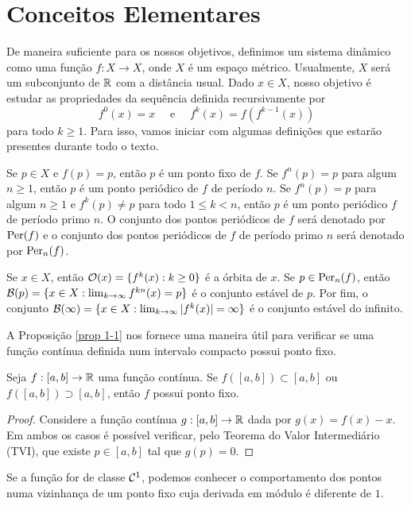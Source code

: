 \section{Conceitos Elementares}

De maneira suficiente para os nossos objetivos, definimos um sistema dinâmico como uma função $f: X \to X$, onde $X$ é um espaço métrico.
Usualmente, $X$ será um subconjunto de $\mathbb{R}$ com a distância usual.
Dado $x \in X$, nosso objetivo é estudar as propriedades da sequência definida recursivamente por
$$f^0(x) = x \quad \text{ e } \quad f^k(x) = f(f^{k-1}(x))$$
para todo $k \geq 1$. Para isso, vamos iniciar com algumas definições que estarão presentes durante todo o texto.

Se $p \in X$ e $f(p) = p$, então $p$ é um ponto fixo de $f$.
Se $f^n(p) = p$ para algum $n \geq 1$, então $p$ é um ponto periódico de $f$ de período $n$.
Se $f^n(p) = p$ para algum $n \geq 1$ e $f^k(p) \neq p$ para todo $1 \leq k < n$, então $p$ é um ponto periódico $f$ de período primo $n$.
O conjunto dos pontos periódicos de $f$ será denotado por $\operatorname{Per}(f)$ e o conjunto dos pontos periódicos de $f$ de período primo $n$ será denotado por $\operatorname{Per}_n(f)$.

Se $x \in X$, então $\mathcal{O}(x) = \lbrace f^k(x) : k \geq 0 \rbrace$ é a órbita de $x$.
Se $p \in \operatorname{Per}_n(f)$, então $\mathcal{B}(p) = \lbrace x \in  X: \lim_{k \to \infty} f^{kn}(x) = p \rbrace$ é o conjunto estável de $p$.
Por fim, o conjunto $\mathcal{B}(\infty) = \lbrace x \in  X: \lim_{k \to \infty} |f^k(x)| = \infty \rbrace$ é o conjunto estável do infinito.

A Proposição \ref{prop 1-1} nos fornece uma maneira útil para verificar se uma função contínua definida num intervalo compacto possui ponto fixo.

\begin{proposition}\label{prop 1-1}
Seja $f: [a, b] \to \mathbb{R}$ uma função contínua. Se $f([a, b]) \subset [a, b]$ ou $f([a, b]) \supset [a, b]$, então $f$ possui ponto fixo.
\end{proposition}

\begin{proof}
Considere a função contínua $g: [a, b] \to \mathbb{R}$ dada por $g(x) = f(x) - x$. Em ambos os casos é possível verificar, pelo Teorema do Valor Intermediário (TVI), que existe $p \in [a, b]$ tal que $g(p) = 0$.
\end{proof}

Se a função for de classe $\mathcal{C}^1$, podemos conhecer o comportamento dos pontos numa vizinhança de um ponto fixo cuja derivada em módulo é diferente de $1$.

